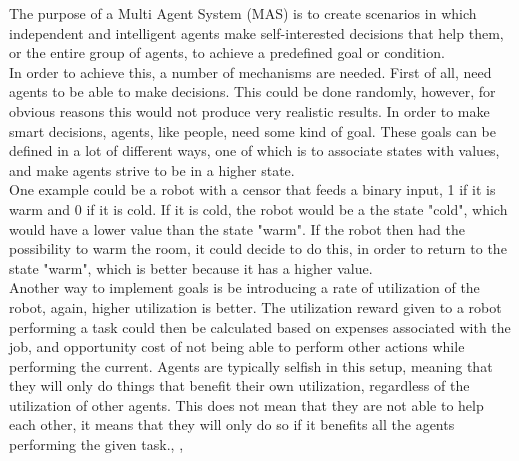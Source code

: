 The purpose of a Multi Agent System (MAS) is to create scenarios in which independent and intelligent agents make self-interested decisions that help them, or the entire group of agents, to achieve a predefined goal or condition.\\

\indent In order to achieve this, a number of mechanisms are needed. First of all, need agents to be able to make decisions. This could be done randomly, however, for obvious reasons this would not produce very realistic results. In order to make smart decisions, agents, like people, need some kind of goal. These goals can be defined in a lot of different ways, one of which is to associate states with values, and make agents strive to be in a higher state.\cite{MAS} \\ 

\indent One example could be a robot with a censor that feeds a binary input, 1 if it is warm and 0 if it is cold. If it is cold, the robot would be a the state "cold", which would have a lower value than the state "warm". If the robot then had the possibility to warm the room, it could decide to do this, in order to return to the state "warm", which is better because it has a higher value.\\

\indent Another way to implement goals is be introducing a rate of utilization of the robot, again, higher utilization is better. The utilization reward given to a robot performing a task could then be calculated based on expenses associated with the job, and opportunity cost of not being able to perform other actions while performing the current. Agents are typically selfish in this setup, meaning that they will only do things that benefit their own utilization, regardless of the utilization of other agents. This does not mean that they are not able to help each other, it means that they will only do so if it benefits all the agents performing the given task.\cite{MAS}, \cite{MAP}, \cite{fundamentalsofMAS}